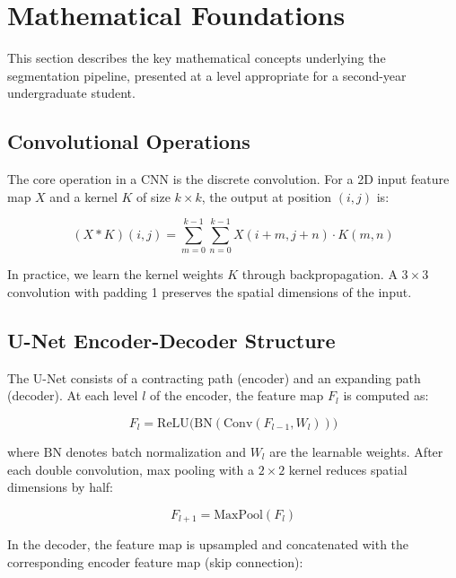 \documentclass[12pt,a4paper]{article}
\begin{document}
\section{Mathematical Foundations}
\label{sec:mathematical}

This section describes the key mathematical concepts underlying the segmentation pipeline, presented at a level appropriate for a second-year undergraduate student.

\subsection{Convolutional Operations}

The core operation in a CNN is the discrete convolution. For a 2D input feature map $X$ and a kernel $K$ of size $k \times k$, the output at position $(i,j)$ is:

\begin{equation}
    (X * K)(i,j) = \sum_{m=0}^{k-1} \sum_{n=0}^{k-1} X(i+m, j+n) \cdot K(m,n)
\end{equation}

In practice, we learn the kernel weights $K$ through backpropagation. A $3 \times 3$ convolution with padding 1 preserves the spatial dimensions of the input.

\subsection{U-Net Encoder-Decoder Structure}

The U-Net consists of a contracting path (encoder) and an expanding path (decoder). At each level $l$ of the encoder, the feature map $F_l$ is computed as:

\begin{equation}
    F_l = \text{ReLU}\bigl(\text{BN}(\text{Conv}(F_{l-1}, W_l))\bigr)
\end{equation}

where $\text{BN}$ denotes batch normalization and $W_l$ are the learnable weights. After each double convolution, max pooling with a $2 \times 2$ kernel reduces spatial dimensions by half:

\begin{equation}
    F_{l+1} = \text{MaxPool}(F_l)
\end{equation}

In the decoder, the feature map is upsampled and concatenated with the corresponding encoder feature map (skip connection):
\end{document}
